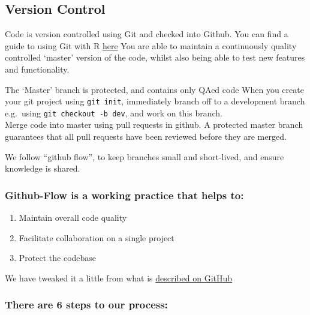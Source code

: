 \documentclass[]{book}
\providecommand{\tightlist}{%
  \setlength{\itemsep}{0pt}\setlength{\parskip}{0pt}}
\begin{document}
\hypertarget{versioncontrol}{%
\subsection{Version Control}\label{versioncontrol}}

Code is version controlled using Git and checked into Github.
You can find a guide to using Git with R \href{http://happygitwithr.com/}{here}
You are able to maintain a continuously quality controlled `master' version of the code, whilst also being able to test new features and functionality.

The `Master' branch is protected, and contains only QAed code
When you create your git project using \texttt{git\ init}, immediately branch off to a development branch e.g.~using \texttt{git\ checkout\ -b\ dev}, and work on this branch.\\
Merge code into master using pull requests in github. A protected master branch guarantees that all pull requests have been reviewed before they are merged.

We follow ``github flow'', to keep branches small and short-lived, and ensure knowledge is shared.

\hypertarget{github-flow-is-a-working-practice-that-helps-to}{%
\subsubsection*{Github-Flow is a working practice that helps to:}\label{github-flow-is-a-working-practice-that-helps-to}}

\begin{enumerate}
\def\labelenumi{\arabic{enumi}.}
\tightlist
\item
  Maintain overall code quality\\
\item
  Facilitate collaboration on a single project\\
\item
  Protect the codebase
\end{enumerate}

We have tweaked it a little from what is \href{https://guides.github.com/introduction/flow/}{described on GitHub}

\hypertarget{there-are-6-steps-to-our-process}{%
\subsubsection*{There are 6 steps to our process:}\label{there-are-6-steps-to-our-process}}
\end{document}
